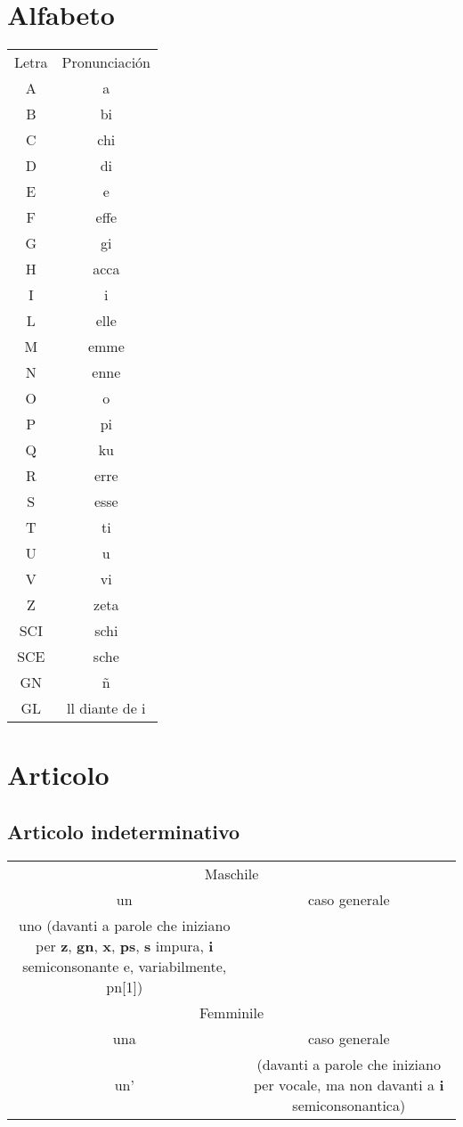 \section{Alfabeto}
	\begin{tabular}{cc}
Letra&Pronunciación\\
	A& a \\
	B&bi\\
	C&chi\\
	D&di\\
	E&e\\
	F&effe\\
	G&gi\\
	H&acca\\
	I&i\\
	L&elle\\
	M&emme\\
	N&enne\\
	O&o\\
	P&pi\\
	Q&ku\\
	R&erre\\
	S&esse\\
	T&ti\\
	U&u\\
	V&vi\\
	Z&zeta\\
SCI	&schi\\
	SCE	&sche\\
		GN	&ñ\\
			GL	&ll diante de i\\
\end{tabular}
\section{Articolo}
\subsection{Articolo indeterminativo}
\begin{tabular}{cc}
\multicolumn{2}{x}{Maschile}\\
un& caso generale\\
uno (davanti a parole che iniziano per \textbf{z}, \textbf{gn}, \textbf{x}, \textbf{ps}, \textbf{s} impura, \textbf{i} semiconsonante e, variabilmente, pn[1])\\
\multicolumn{2}{x}{Femminile}\\
una& caso generale\\
un' & (davanti a parole che iniziano per vocale, ma non davanti a \textbf{i} semiconsonantica)
\end{tabular}
